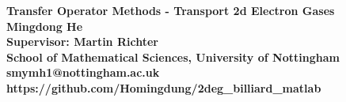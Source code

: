 \documentclass[a0,portrait]{a0poster}
\begin{document}



\begin{minipage}[b]{0.75\linewidth}
\VeryHuge \color{NavyBlue} \textbf{Transfer Operator Methods - Transport 2d Electron Gases}
\color{Black}\\[0.4cm] 
\Large \textbf{Mingdong He}\\
\Large \textbf{Supervisor: Martin Richter}\\
\large \textbf{School of Mathematical Sciences, University of Nottingham}\\ 
\large \textbf{\Letter \space smymh1@nottingham.ac.uk}\\
\large \textbf{\faGithub \space 
https://github.com/Homingdung/2deg\_billiard\_matlab}
\end{minipage}
%


\end{document}
